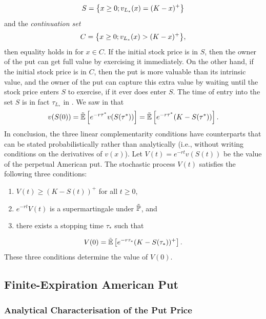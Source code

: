 \begin{equation} \label{StoppingSetDefinition}
	S = \set[\big]{x \ge 0; v_{L_*}(x) = (K-x)^+}
\end{equation}
and the \textit{continuation set}
\begin{equation} \label{ContinuationSetDefinition}
	C = \set[\big]{x \ge 0; v_{L_*}(x) > (K-x)^+},
\end{equation}
then equality holds in  for $x \in C$. If the initial stock price is in $S$, then the owner of the put can get full value by exercising it immediately. On the other hand, if the initial stock price is in $C$, then the put is more valuable than its intrinsic value, and the owner of the put can capture this extra value by waiting until the stock price enters $S$ to exercise, if it ever does enter $S$. The time of entry into the set $S$ is in fact $\tau_{L_*}$ in . We saw in  that
\begin{equation*}
	v(S(0)) = \tilde{\E} \left[ e^{-r\tau^*} v(S(\tau^*)) \right] = \tilde{\E} \left[ e^{-r\tau^*} (K - S(\tau^*)) \right].
\end{equation*}
In conclusion, the three linear complementarity conditions have counterparts that can be stated probabilistically rather than analytically (i.e., without writing conditions on the derivatives of $v(x)$). Let $V(t) = e^{-rt}v(S(t))$ be the value of the perpetual American put. The stochastic process $V(t)$ satisfies the following three conditions:
\begin{enumerate}[label=(\roman*)]
	\item $V(t) \ge (K - S(t))^+$ for all $t \ge 0$,
	\item $e^{-rt}V(t)$ is a supermartingale under $\tilde{\Prob}$, and
	\item there exists a stopping time $\tau_*$ such that
\end{enumerate}
\begin{equation*}
	V(0) = \tilde{\E} \left[ e^{-r\tau_*} (K - S(\tau_*))^+ \right].
\end{equation*}
These three conditions determine the value of $V(0)$.

\subsection{Finite-Expiration American Put}

\subsubsection{Analytical Characterisation of the Put Price}

